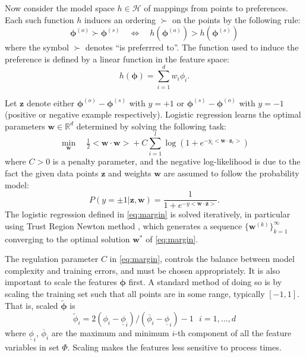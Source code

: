 \documentclass[10pt]{llncs}
\renewcommand{\vec}[1]{{\mbox{\boldmath$#1$}}}
\newcommand{\inner}[2]{\big<\vec{#1}\cdot\vec{#2}\big>}
\renewcommand{\vec}[1]{{\mathbf #1}}
\begin{document}
Now consider the model space $h\in\mathcal{H}$ of mappings from points to preferences. Each such function $h$ induces an ordering $\succ$ on the points by the following rule:
\begin{equation}
 \vec{\phi}^{(o)}\succ\vec{\phi}^{(s)} \quad \Leftrightarrow \quad h(\vec{\phi}^{(o)})>h(\vec{\phi}^{(s)})
\end{equation}
where the symbol $\succ$ denotes ``is preferrred to''. 
The function used to induce the preference is defined by a linear function in the feature space:
\begin{equation}
 h(\vec{\phi})=\sum_{i=1}^d w_i\phi_i.
\end{equation}

Let $\vec{z}$ denote either $\vec{\phi}^{(o)}-\vec{\phi}^{(s)}$ with $y=+1$ or $\vec{\phi}^{(s)}-\vec{\phi}^{(o)}$ with $y=-1$ (positive or negative example respectively).
Logistic regression learns the optimal parameters $\vec{w}\in\mathbb{R}^d$ determined by solving the following task:
\begin{equation}\label{eq:margin}
\min_{\vec{w}}\quad \tfrac{1}{2}\inner{w}{w} + C \sum_{i=1}^l \log\left(1 + e^{-y_i \inner{w}{z_i}}\right) 
\end{equation}
where $C > 0$ is a penalty parameter, and the negative log-likelihood is due to the fact the given data points $\vec{z}$ and weights $\vec{w}$ are assumed to follow the probability model:
\begin{equation}\label{eq:prob}
 P(y=\pm1|\vec{z},\vec{w})=\frac{1}{1+e^{-y\inner{w}{z}}}.
\end{equation}
The logistic regression defined in \eqref{eq:margin} is solved iteratively, in particular using Trust Region Newton method \cite{newtontrustregion}, which generates a sequence $\{\vec{w^{(k)}}\}_{k=1}^\infty$ converging to the optimal solution $\vec{w}^*$ of \eqref{eq:margin}.

The regulation parameter $C$ in \eqref{eq:margin}, controls the balance between model complexity and training errors, and must be chosen appropriately. It is also important to scale the features $\vec{\phi}$ first. A standard method of doing so is by scaling the training set such that all points are in some range, typically $[-1,1]$. That is, scaled $\tilde{\vec{\phi}}$ is
\begin{equation}\label{eq:scale}
\tilde \phi_i = 2 (\phi_i - \underline{\phi}_i) / (\overline{\phi}_i - \underline{\phi}_i) - 1 ~~~ i = 1,\ldots,d
\end{equation}
where $\underline{\phi}_i$, $\overline{\phi}_i$ are the maximum and minimum $i$-th component of all the feature variables in set $\Phi$. Scaling makes the features less sensitive to process times.
\end{document}
